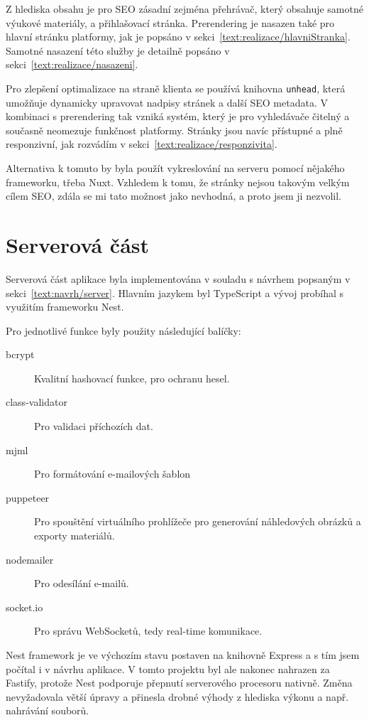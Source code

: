Z hlediska obsahu je pro SEO zásadní zejména přehrávač, který obsahuje samotné výukové materiály, a přihlašovací stránka. 
Prerendering je nasazen také pro hlavní stránku platformy, jak je popsáno v sekci~\ref{text:realizace/hlavniStranka}. 
Samotné nasazení této služby je detailně popsáno v sekci~\ref{text:realizace/nasazeni}.

Pro zlepšení optimalizace na straně klienta se používá knihovna \texttt{unhead}, která umožňuje dynamicky upravovat nadpisy stránek a další SEO metadata. 
V kombinaci s prerendering tak vzniká systém, který je pro vyhledávače čitelný a současně neomezuje funkčnost platformy. 
Stránky jsou navíc přístupné a plně responzivní, jak rozvádím v sekci~\ref{text:realizace/responzivita}.

Alternativa k tomuto by byla použít vykreslování na serveru pomocí nějakého frameworku, třeba Nuxt.
Vzhledem k tomu, že stránky nejsou takovým velkým cílem SEO, zdála se mi tato možnost jako nevhodná, a proto jsem ji nezvolil.

\section{Serverová část}\label{text:realizace/server}

Serverová část aplikace byla implementována v souladu s návrhem popsaným v sekci~\ref{text:navrh/server}. 
Hlavním jazykem byl TypeScript a vývoj probíhal s využitím frameworku Nest. 

Pro jednotlivé funkce byly použity následující balíčky:

\begin{description}
    \item[bcrypt] Kvalitní hashovací funkce, pro ochranu hesel.
    \item[class-validator] Pro validaci příchozích dat.
    \item[mjml] Pro formátování e-mailových šablon
    \item[puppeteer] Pro spouštění virtuálního prohlížeče pro generování náhledových obrázků a exporty materiálů.
    \item[nodemailer] Pro odesílání e-mailů.
    \item[socket.io] Pro správu WebSocketů, tedy real-time komunikace.
\end{description}

Nest framework je ve výchozím stavu postaven na knihovně Express a s tím jsem počítal i v návrhu aplikace.
V tomto projektu byl ale nakonec nahrazen za Fastify, protože Nest podporuje přepnutí serverového procesoru nativně. 
Změna nevyžadovala větší úpravy a přinesla drobné výhody z hlediska výkonu a např. nahrávání souborů.


